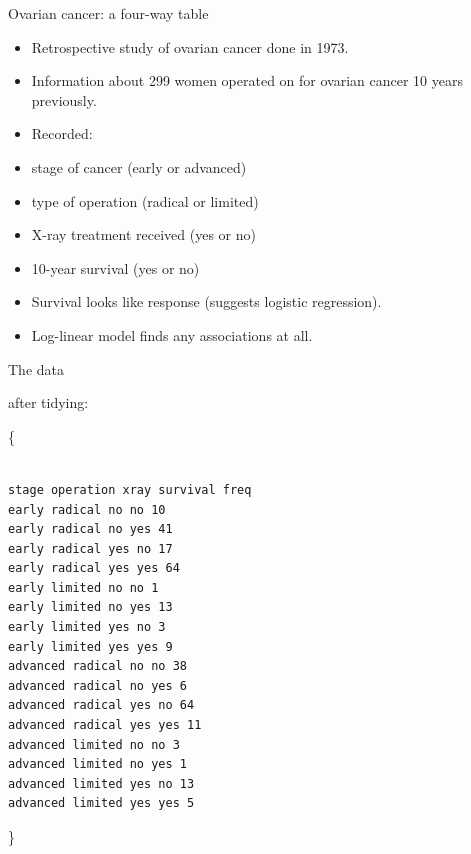 \documentclass[ignorenonframetext,]{beamer}
\begin{document}
\begin{frame}{Ovarian cancer: a four-way table}
\protect\hypertarget{ovarian-cancer-a-four-way-table}{}

\begin{itemize}
\item
  Retrospective study of ovarian cancer done in 1973.
\item
  Information about 299 women operated on for ovarian cancer 10 years
  previously.
\item
  Recorded:
\item
  stage of cancer (early or advanced)
\item
  type of operation (radical or limited)
\item
  X-ray treatment received (yes or no)
\item
  10-year survival (yes or no)
\item
  Survival looks like response (suggests logistic regression).
\item
  Log-linear model finds any associations at all.
\end{itemize}

\end{frame}

\begin{frame}[fragile]{The data}
\protect\hypertarget{the-data-1}{}

after tidying:

\{\scriptsize

\begin{verbatim}

stage operation xray survival freq
early radical no no 10
early radical no yes 41
early radical yes no 17
early radical yes yes 64
early limited no no 1
early limited no yes 13
early limited yes no 3
early limited yes yes 9
advanced radical no no 38
advanced radical no yes 6
advanced radical yes no 64
advanced radical yes yes 11
advanced limited no no 3
advanced limited no yes 1
advanced limited yes no 13
advanced limited yes yes 5

\end{verbatim}

\}

\end{frame}
\end{document}
